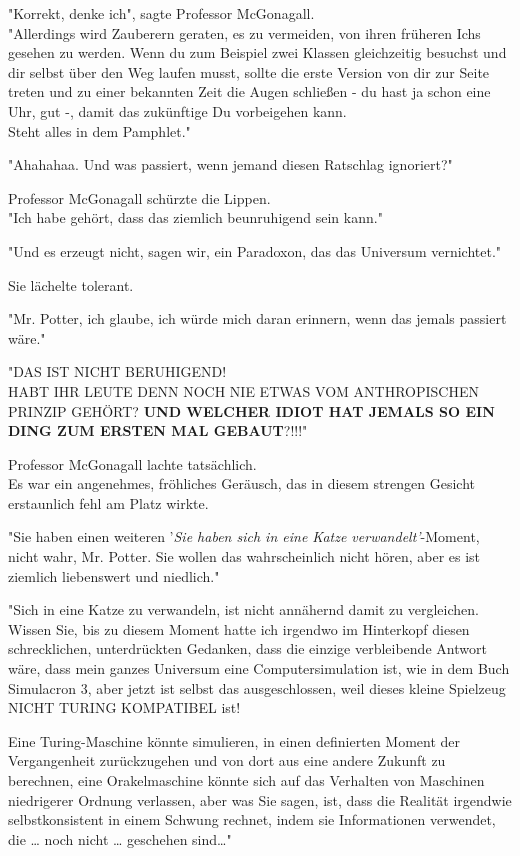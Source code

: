 {"Korrekt, denke ich", sagte Professor McGonagall.\\ "Allerdings wird Zauberern geraten, es zu vermeiden, von ihren früheren Ichs gesehen zu werden. Wenn du zum Beispiel zwei Klassen gleichzeitig besuchst und dir selbst über den Weg laufen musst, sollte die erste Version von dir zur Seite treten und zu einer bekannten Zeit die Augen schließen - du hast ja schon eine Uhr, gut -, damit das zukünftige Du vorbeigehen kann.\\ Steht alles in dem Pamphlet."

"Ahahahaa. Und was passiert, wenn jemand diesen Ratschlag ignoriert?"

Professor McGonagall schürzte die Lippen.\\ "Ich habe gehört, dass das ziemlich beunruhigend sein kann."

"Und es erzeugt nicht, sagen wir, ein Paradoxon, das das Universum vernichtet."

Sie lächelte tolerant.

"Mr. Potter, ich glaube, ich würde mich daran erinnern, wenn das jemals passiert wäre."

"DAS IST NICHT BERUHIGEND!\\ HABT IHR LEUTE DENN NOCH NIE ETWAS VOM ANTHROPISCHEN PRINZIP GEHÖRT? \textbf{UND WELCHER IDIOT HAT JEMALS SO EIN DING ZUM ERSTEN MAL GEBAUT}?!!!"

Professor McGonagall lachte tatsächlich.\\ Es war ein angenehmes, fröhliches Geräusch, das in diesem strengen Gesicht erstaunlich fehl am Platz wirkte.

"Sie haben einen weiteren '\emph{Sie haben sich in eine Katze verwandelt'}-Moment, nicht wahr, Mr. Potter. Sie wollen das wahrscheinlich nicht hören, aber es ist ziemlich liebenswert und niedlich."

"Sich in eine Katze zu verwandeln, ist nicht annähernd damit zu vergleichen.\\ Wissen Sie, bis zu diesem Moment hatte ich irgendwo im Hinterkopf diesen schrecklichen, unterdrückten Gedanken, dass die einzige verbleibende Antwort wäre, dass mein ganzes Universum eine Computersimulation ist, wie in dem Buch Simulacron 3, aber jetzt ist selbst das ausgeschlossen, weil dieses kleine Spielzeug NICHT TURING KOMPATIBEL ist!

Eine Turing-Maschine könnte simulieren, in einen definierten Moment der Vergangenheit zurückzugehen und von dort aus eine andere Zukunft zu berechnen, eine Orakelmaschine könnte sich auf das Verhalten von Maschinen niedrigerer Ordnung verlassen, aber was Sie sagen, ist, dass die Realität irgendwie selbstkonsistent in einem Schwung rechnet, indem sie Informationen verwendet, die … noch nicht … geschehen sind…"

}
